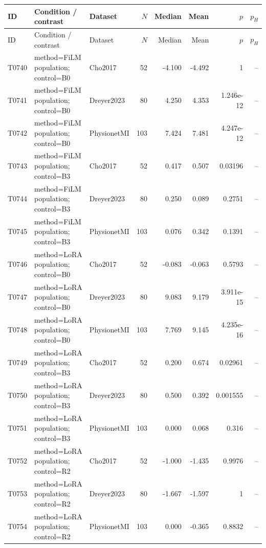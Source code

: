 \begin{longtable}{p{.45in}p{2.6in}p{.75in}rrrrr}
\toprule
ID & Condition / contrast & Dataset & $N$ & Median & Mean & $p$ & $p_H$ \\
\midrule
\endfirsthead
\toprule
ID & Condition / contrast & Dataset & $N$ & Median & Mean & $p$ & $p_H$ \\
\midrule
\endhead
T0740 & method=FiLM population; control=B0 & Cho2017 & 52 & -4.100 & -4.492 & 1 & -- \\
T0741 & method=FiLM population; control=B0 & Dreyer2023 & 80 & 4.250 & 4.353 & 1.246e-12 & -- \\
T0742 & method=FiLM population; control=B0 & PhysionetMI & 103 & 7.424 & 7.481 & 4.247e-12 & -- \\
T0743 & method=FiLM population; control=B3 & Cho2017 & 52 & 0.417 & 0.507 & 0.03196 & -- \\
T0744 & method=FiLM population; control=B3 & Dreyer2023 & 80 & 0.250 & 0.089 & 0.2751 & -- \\
T0745 & method=FiLM population; control=B3 & PhysionetMI & 103 & 0.076 & 0.342 & 0.1391 & -- \\
T0746 & method=LoRA population; control=B0 & Cho2017 & 52 & -0.083 & -0.063 & 0.5793 & -- \\
T0747 & method=LoRA population; control=B0 & Dreyer2023 & 80 & 9.083 & 9.179 & 3.911e-15 & -- \\
T0748 & method=LoRA population; control=B0 & PhysionetMI & 103 & 7.769 & 9.145 & 4.235e-16 & -- \\
T0749 & method=LoRA population; control=B3 & Cho2017 & 52 & 0.200 & 0.674 & 0.02961 & -- \\
T0750 & method=LoRA population; control=B3 & Dreyer2023 & 80 & 0.500 & 0.392 & 0.001555 & -- \\
T0751 & method=LoRA population; control=B3 & PhysionetMI & 103 & 0.000 & 0.068 & 0.316 & -- \\
T0752 & method=LoRA population; control=R2 & Cho2017 & 52 & -1.000 & -1.435 & 0.9976 & -- \\
T0753 & method=LoRA population; control=R2 & Dreyer2023 & 80 & -1.667 & -1.597 & 1 & -- \\
T0754 & method=LoRA population; control=R2 & PhysionetMI & 103 & 0.000 & -0.365 & 0.8832 & -- \\
\bottomrule
\end{longtable}
